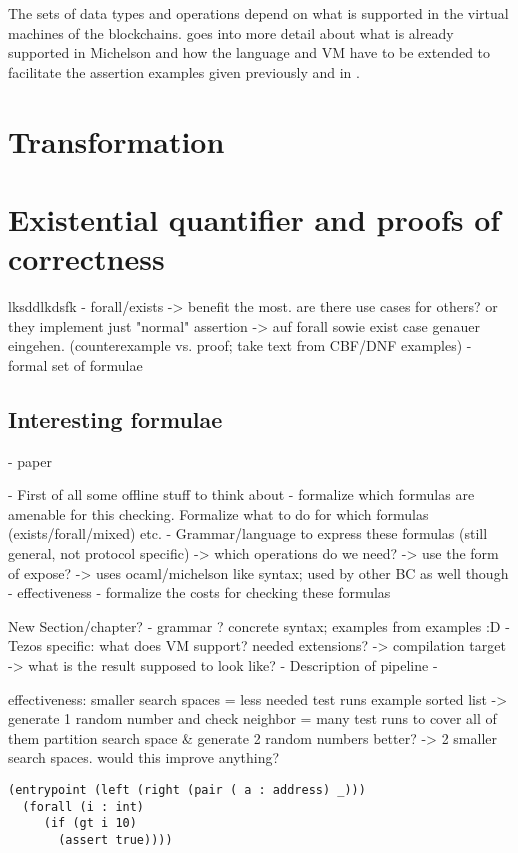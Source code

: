 The sets of data types and operations depend on what is supported in the virtual machines of the blockchains.  goes into more detail about what is already supported in Michelson and how the language and VM have to be extended to facilitate the assertion examples given previously and in .

\section{Transformation}\label{sec:transformation}

\section{Existential quantifier and proofs of correctness}
lksddlkdsfk
- forall/exists -> benefit the most. are there use cases for others? or they implement just "normal" assertion
	-> auf forall sowie exist case genauer eingehen. (counterexample vs. proof; take text from CBF/DNF examples)
- formal set of formulae

\subsection{Interesting formulae}\label{sec:example_formulae}
- paper


- First of all some offline stuff to think about - formalize which formulas are amenable for this checking. Formalize what to do for which formulas (exists/forall/mixed) etc.
- Grammar/language to express these formulas (still general, not protocol specific)
	-> which operations do we need?
	-> use the form of expose?
	-> uses ocaml/michelson like syntax; used by other BC as well though
- effectiveness
- formalize the costs for checking these formulas



New Section/chapter? %
- grammar ? concrete syntax; examples from examples :D
- Tezos specific: what does VM support? needed extensions?
	-> compilation target -> what is the result supposed to look like?
- Description of pipeline
- 



effectiveness:
smaller search spaces = less needed test runs
example sorted list -> generate 1 random number and check neighbor = many test runs to cover all of them
partition search space \& generate 2 random numbers better? -> 2 smaller search spaces. would this improve anything?



\begin{lstlisting}[numbers=none, language=Assertion]
(entrypoint (left (right (pair ( a : address) _)))
  (forall (i : int)
     (if (gt i 10)
       (assert true))))
\end{lstlisting}